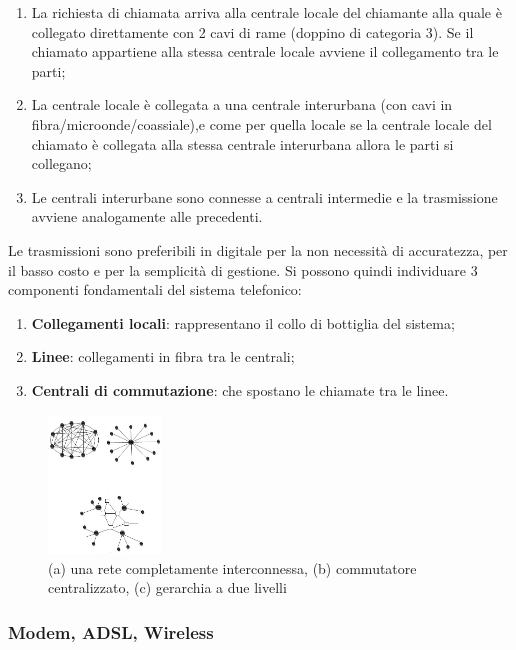 \begin{enumerate}

\item{La richiesta di chiamata arriva alla centrale locale del chiamante alla quale è collegato direttamente con 2 cavi di rame (doppino di categoria 3). Se il chiamato appartiene alla stessa centrale locale avviene il collegamento tra le parti};
\item{La centrale locale è collegata a una centrale interurbana (con cavi in fibra/microonde/coassiale),e come per quella locale se la centrale locale del chiamato è collegata alla stessa centrale interurbana allora le parti si collegano};
\item{Le centrali interurbane sono connesse a centrali intermedie e la trasmissione avviene analogamente alle precedenti}.

\end{enumerate}

Le trasmissioni sono preferibili in digitale per la non necessità di accuratezza, per il basso costo e per la semplicità di gestione.
Si possono quindi individuare 3 componenti fondamentali del sistema telefonico:

\begin{enumerate}

\item{\textbf{Collegamenti locali}: rappresentano il collo di bottiglia del sistema};
\item{\textbf{Linee}: collegamenti in fibra tra le centrali};
\item{\textbf{Centrali di commutazione}: che spostano le chiamate tra le linee}.

\end{enumerate}

\begin{figure}[htpd]
\centering
\includegraphics[width=30mm]{images/telephone_network.jpg}
\caption{(a) una rete completamente interconnessa, (b) commutatore centralizzato, (c) gerarchia a due livelli}
\end{figure}

\subsubsection{Modem, ADSL, Wireless}

